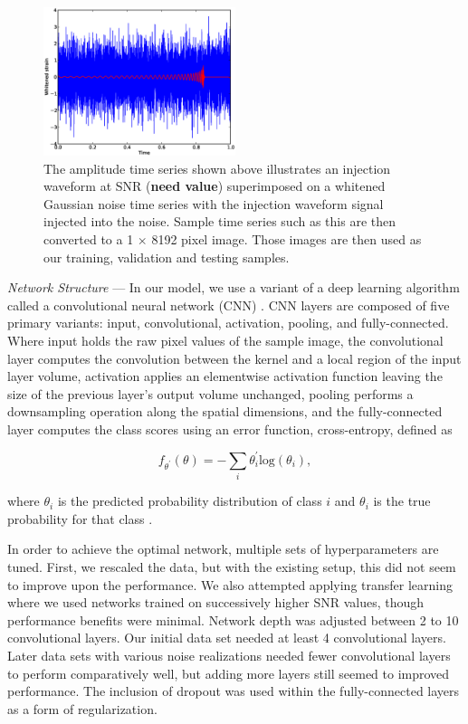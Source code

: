 \documentclass[%
 amsmath,amssymb,
 aps,
 twocolumn,
 prl,
 reprint,
floatfix,
]{revtex4-1}
\begin{document}
\begin{figure}
 \includegraphics[width=0.5\textwidth]
 {figures/waveform.eps}
 \caption{\label{fig:waveform} The amplitude time series shown above illustrates an injection waveform at SNR (\textbf{need value}) superimposed on a whitened Gaussian noise time series with the injection waveform signal injected into the noise. Sample time series such as this are then converted to a 1 $\times$ 8192 pixel image. Those images are then used as our training, validation and testing samples.}
\end{figure}

\textit{Network Structure} --- In our model, we use a variant of a deep learning algorithm called a convolutional neural network (CNN) \cite{726791}. CNN layers are composed of five primary variants: input, convolutional, activation, pooling, and fully-connected. Where input holds the raw pixel values of the sample image, the convolutional layer computes the convolution between the kernel and a local region of the input layer volume, activation applies an elementwise activation function leaving the size of the previous layer's output volume unchanged, pooling performs a downsampling operation along the spatial dimensions, and the fully-connected layer computes the class scores using an error function, cross-entropy, defined as

\begin{equation} \label{eq:loss}
f_{\theta^{'}}(\theta) = -\sum_{i} \theta_{i}^{'} \mathrm{log}(\theta_{i}),
\end{equation}

where $\theta_{i}$ is the predicted probability distribution of class $i$ and $\theta_{i}$ is the true probability for that class \cite{tensorflow2015-whitepaper}. 

In order to achieve the optimal network, multiple sets of hyperparameters are tuned. First, we rescaled the data, but with the existing setup, this did not seem to improve upon the performance. We also attempted applying transfer learning where we used networks trained on successively higher SNR values, though performance benefits were minimal. Network depth was adjusted between 2 to 10 convolutional layers. Our initial data set needed at least 4 convolutional layers. Later data sets with various noise realizations needed fewer convolutional layers to perform comparatively well, but adding more layers still seemed to improved performance. The inclusion of dropout was used within the fully-connected layers as a form of regularization.
\end{document}
